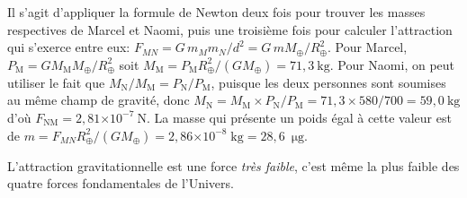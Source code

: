\documentclass[a4paper,10pt]{report}
\newcounter{noexo}
\newenvironment{Exercise}[1][]{%
  \refstepcounter{noexo}
  \medskip\noindent\textbf{Exercice~\thenoexo~:~#1}
  \medskip\par
  \addcontentsline{toc}{paragraph}{Exercice~\thenoexo~:~#1}
  \label{exo:\thenoexo}
}{}
\newcommand{\e}[1]{\ensuremath{\times 10^{#1}}}
\renewcommand{\u}[1]{\ensuremath{\mathrm{#1}}} %
\begin{document}
\begin{Answer}
  Il s'agit d'appliquer la formule de Newton deux fois pour trouver
  les masses respectives de Marcel et Naomi, puis une troisième fois
  pour calculer l'attraction qui s'exerce entre eux: $F_{MN} = G\,m_M
  m_N/d^2 = G\,m M_{\oplus}/R_{\oplus}^2$.  Pour Marcel,
  $P_{\mathrm{M}} = G M_{\mathrm{M}}M_{\oplus} / R_{\oplus}^2$ soit
  $M_{\mathrm{M}} = P_{\mathrm{M}}R_{\oplus}^2 / (G M_{\oplus}) =
  71,3~\u{kg}$. Pour Naomi, on peut utiliser le fait que
  $M_{\mathrm{N}}/M_{\mathrm{M}} = P_{\mathrm{N}} / P_{\mathrm{M}}$,
  puisque les deux personnes sont soumises au même champ de gravité,
  donc $M_{\mathrm{N}} = M_{\mathrm{M}}\times
  P_{\mathrm{N}}/P_{\mathrm{M}} = 71,3 \times 580/700 = 59,0~\u{kg}$
  d'où $F_{\mathrm{NM}} = 2,81\e{-7}~\u{N}.$ La masse qui présente un
  poids égal à cette valeur est de $m =
  F_{MN}R_{\oplus}^{2}/(GM_{\oplus}) = 2,86\e{-8}\;\u{kg} =
  28,6$~\u{\mu{}g}.

  L'attraction gravitationnelle est une force \emph{très faible},
  c'est même la plus faible des quatre forces fondamentales de
  l'Univers.
\end{Answer}



\end{document}
